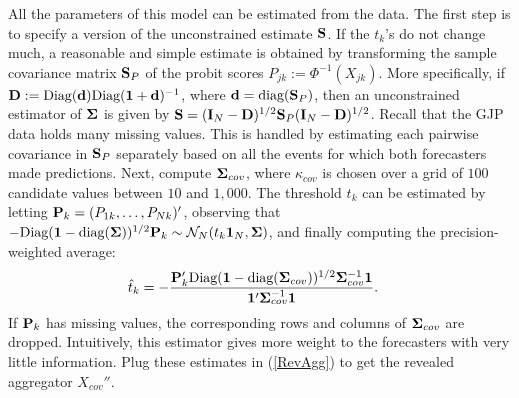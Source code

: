 \documentclass[11pt]{article}
\newcommand{\PP}{{\bf P}}
\renewcommand{\P}{\mathbb{P}}
\theoremstyle{definition}
\theoremstyle{definition}
\def\one{{\bf 1}}
\def\bSigma{{\bf \Sigma}}
\def\dd{{\bf d}}
\def\D{{\bf D}}
\def\SS{{\bf S}}
\def\I{{\bf I}}
\def\P{{\mathbb P}}
\def\Cov{{\rm Cov}\,}
\def\diag{\text{diag}}
\def\Diag{\text{Diag}}
\def\diag{\text{diag}}
\begin{document}


All the parameters of this model can be estimated from the data. The first step is to specify a version of the  unconstrained estimate $\SS$. If the $t_k$'s do not change much, a reasonable and simple estimate is obtained  by transforming the sample covariance matrix  $\SS_P$ of the probit scores $P_{jk} := \Phi^{-1}(X_{jk})$. More specifically,  if $\D := \Diag( \dd ) \Diag(\one + \dd)^{-1}$, where $\dd = \diag(\SS_P)$, then an unconstrained estimator of $\bSigma$ is given by $\SS = (\I_N-\D)^{1/2} \SS_P (\I_N-\D)^{1/2}$. Recall that the GJP data holds many missing values. This is handled by estimating each pairwise covariance in $\SS_P$ separately based on all the events for which both forecasters made predictions. 
Next, compute $\bSigma_{cov}$, where $\kappa_{cov}$ is chosen over a grid of $100$ candidate values between $10$ and $1,000$. 
The threshold $t_k$ can be estimated by letting $\PP_k = (P_{1k}, \dots, P_{Nk})'$, observing that $-\Diag(\one-\diag(\bSigma))^{1/2}\PP_{k} \sim \mathcal{N}_N(t_k \one_N, \bSigma)$,
% 
and finally computing the precision-weighted average: 
\begin{align*}
\hat{t}_k &= -\frac{\PP_{k}' \Diag(\one-\diag(\bSigma_{cov}))^{1/2} \bSigma_{cov}^{-1} \one}{\one' \bSigma_{cov}^{-1} \one}.
\end{align*}
 If $\PP_k$ has missing values, the corresponding rows and columns of $\bSigma_{cov}$ are dropped. Intuitively, this estimator gives more weight to the forecasters with very little information. Plug these estimates in (\ref{RevAgg}) to get the revealed aggregator  $X_{cov}''$. 
\end{document}
